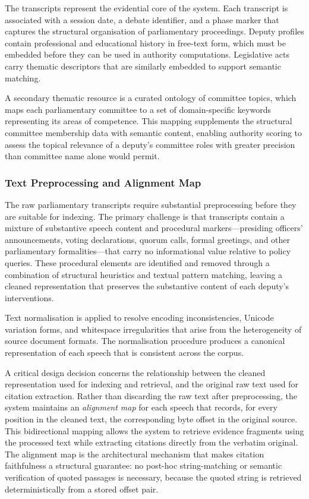 The transcripts represent the evidential core of the system. Each transcript is associated
with a session date, a debate identifier, and a phase marker that captures the structural
organisation of parliamentary proceedings. Deputy profiles contain professional and
educational history in free-text form, which must be embedded before they can be used
in authority computations. Legislative acts carry thematic descriptors that are similarly
embedded to support semantic matching.

A secondary thematic resource is a curated ontology of committee topics, which maps each
parliamentary committee to a set of domain-specific keywords representing its areas of
competence. This mapping supplements the structural committee membership data with
semantic content, enabling authority scoring to assess the topical relevance of a
deputy's committee roles with greater precision than committee name alone would permit.

\subsubsection{Text Preprocessing and Alignment Map}

The raw parliamentary transcripts require substantial preprocessing before they are suitable
for indexing. The primary challenge is that transcripts contain a mixture of substantive
speech content and procedural markers---presiding officers' announcements, voting
declarations, quorum calls, formal greetings, and other parliamentary formalities---that
carry no informational value relative to policy queries. These procedural elements are
identified and removed through a combination of structural heuristics and textual pattern
matching, leaving a cleaned representation that preserves the substantive content of each
deputy's interventions.

Text normalisation is applied to resolve encoding inconsistencies, Unicode variation forms,
and whitespace irregularities that arise from the heterogeneity of source document
formats. The normalisation procedure produces a canonical representation of each speech
that is consistent across the corpus.

A critical design decision concerns the relationship between the cleaned representation used
for indexing and retrieval, and the original raw text used for citation extraction. Rather
than discarding the raw text after preprocessing, the system maintains an
\textit{alignment map} for each speech that records, for every position in the cleaned
text, the corresponding byte offset in the original source. This bidirectional mapping
allows the system to retrieve evidence fragments using the processed text while extracting
citations directly from the verbatim original. The alignment map is the architectural
mechanism that makes citation faithfulness a structural guarantee: no post-hoc
string-matching or semantic verification of quoted passages is necessary, because the
quoted string is retrieved deterministically from a stored offset pair.

